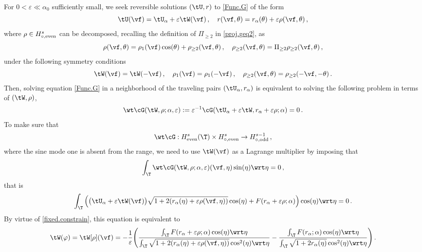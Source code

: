 \documentclass[a4paper,reqno,10pt]{article}
\begin{document}
\noindent
For \(0<\varepsilon\ll \alpha_{0}\) sufficiently small, we seek reversible solutions \((\tU,r)\) to \eqref{Func.G} of the form
\begin{equation}\label{perturbed.solution}
	\tU(\vf) = \tU_{\alpha} + \varepsilon \tW(\vf) \,, \quad r(\vf,\theta) = r_\alpha(\theta) + \varepsilon \rho(\vf,\theta)\,,
\end{equation}
where $\rho\in H^{s}_{\circ,\textnormal{even}}$ can be decomposed, recalling the definition of $\Pi_{\geq 2}$ in \eqref{proj.geq2}, as
\begin{equation}
	\rho(\vf,\theta) =\rho_{1}(\vf) \cos(\theta) + \rho_{\geq 2}(\vf,\theta) \,, \quad \rho_{\geq 2}(\vf,\theta)= \Pi_{\geq 2} \rho_{\geq 2}(\vf,\theta)\,,
\end{equation}
 under the following symmetry conditions
\begin{equation}
	\tW(\vf) = \tW(-\vf)\,, \quad \rho_{1}(\vf)=\rho_{1}(-\vf)\,, \quad \rho_{\geq 2}(\vf,\theta) = \rho_{\geq 2}(-\vf,-\theta)\,.
\end{equation}
Then, solving equation \eqref{Func.G} in a neighborhood of the traveling pairs $(\tU_{\alpha},r_\alpha)$ is equivalent to solving the following problem in terms of $(\tW, \rho)$,
\begin{equation}\label{full.nonlin.eq.pert}
	\wt\cG (\tW,\rho;\alpha,\varepsilon) := \varepsilon^{-1} \cG(\tU_{\alpha}+ \varepsilon \tW, r_\alpha+ \varepsilon \rho;\alpha)=0\,.
\end{equation}
To make sure that
\begin{equation}\label{phase.space.cond}
	\wt\cG:  H_{\rm even}^{s}(\T)\times H^{s}_{\circ,\textnormal{even}}\to H^{s-1}_{\circ,\textnormal{odd}}\,,
\end{equation}
where the sine mode one is absent from the range, we need to use $\tW(\vf)$ as a Lagrange multiplier 
by imposing that
\begin{equation}
	\int_{\T} \wt\cG(\tW,\rho;\alpha,\varepsilon)(\vf,\eta) \sin(\eta) \wrt\eta = 0 \,,
\end{equation}
that is
\begin{equation*}%
	\int_{\T} \Big( \big(\tU_{\alpha}+\varepsilon\tW(\vf)\big) \sqrt{1+2(r_\alpha(\eta)+\varepsilon\rho(\vf,\eta))} \cos(\eta) + F(r_\alpha+\varepsilon\rho;\alpha)  \Big) \cos(\eta) \wrt\eta = 0 \,.
\end{equation*}
By virtue of \eqref{fixed.constrain}, this equation is equivalent to 
\begin{equation}\label{tU1.def}
		    \begin{aligned}
		         \tW(\varphi)=\tW[\rho](\vf) = - \frac{1}{\varepsilon}\Bigg( \frac{\int_{\T} F(r_\alpha+\varepsilon\rho;\alpha)\cos(\eta)\wrt\eta}{\int_{\T}\sqrt{1+2(r_\alpha(\eta)+\varepsilon\rho(\vf,\eta))}\cos^2(\eta)\wrt\eta} -  \frac{\int_{\T} F(r_\alpha;\alpha)\cos(\eta)\wrt\eta}{\int_{\T}\sqrt{1+2r_\alpha(\eta)}\cos^2(\eta)\wrt\eta}  \Bigg)\,.
		    \end{aligned}
	\end{equation}
\end{document}
